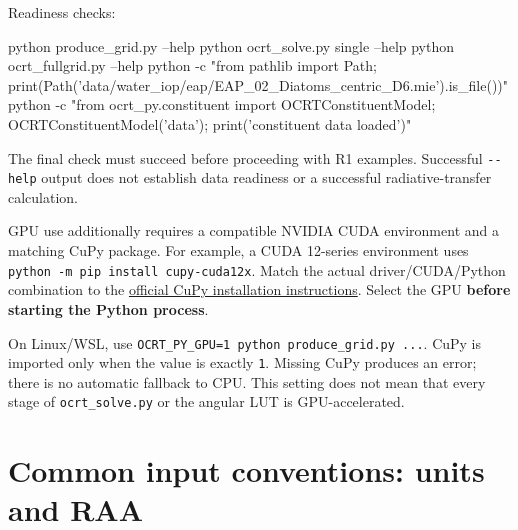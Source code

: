 Readiness checks:


\begin{ManualCode}
python produce_grid.py --help
python ocrt_solve.py single --help
python ocrt_fullgrid.py --help
python -c "from pathlib import Path; print(Path('data/water_iop/eap/EAP_02_Diatoms_centric_D6.mie').is_file())"
python -c "from ocrt_py.constituent import OCRTConstituentModel; OCRTConstituentModel('data'); print('constituent data loaded')"
\end{ManualCode}

The final check must succeed before proceeding with R1 examples. Successful \texttt{-\allowbreak{}-\allowbreak{}help} output does not establish data readiness or a successful radiative-transfer calculation.

GPU use additionally requires a compatible NVIDIA CUDA environment and a matching CuPy package. For example, a CUDA 12-series environment uses \texttt{python -\allowbreak{}m pip install cu\allowbreak{}py-\allowbreak{}cuda12x}. Match the actual driver/CUDA/Python combination to the \href{https://docs.cupy.dev/en/stable/install.html}{official CuPy installation instructions}. Select the GPU \textbf{before starting the Python process}.



On Linux/WSL, use \texttt{OCRT\_\allowbreak{}PY\_\allowbreak{}GPU=\allowbreak{}1 python produce\allowbreak{}\_\allowbreak{}grid.\allowbreak{}py .\allowbreak{}.\allowbreak{}.\allowbreak{}}. CuPy is imported only when the value is exactly \texttt{1}. Missing CuPy produces an error; there is no automatic fallback to CPU. This setting does not mean that every stage of \texttt{ocrt\_\allowbreak{}solve.\allowbreak{}py} or the angular LUT is GPU-accelerated.

\section{Common input conventions: units and RAA}
\label{sec:auto:06_python_batch:3}

